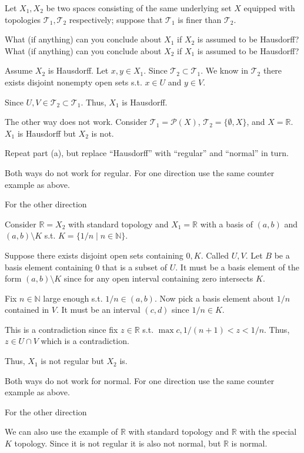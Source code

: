\documentclass[12pt, letterpaper]{article}
\newcommand{\R}{\mathbb{R}}
\newcommand{\N}{\mathbb{N}}
\newcommand{\T}{\mathcal{T}}
\begin{document}
\begin{problem}{}
    Let $X_1, X_2$ be two spaces consisting of the same underlying set
  $X$ equipped with topologies $\T_1, \T_2$ respectively;
  suppose that $\T_1$ is finer than $\T_2$.
\end{problem}

\begin{subproblem}{}
    What (if anything) can you conclude about $X_1$ if $X_2$ is
assumed to be Hausdorff? What (if anything) can you conclude
about $X_2$ if $X_1$ is assumed to be Hausdorff?
\end{subproblem}
\begin{problemproof}
    Assume $X_2$ is Hausdorff. Let $x,y \in X_1$. Since $\T_2 \subset \T_1$. We know in $\T_2$ there exists disjoint nonempty open sets s.t. $x \in U$ and $y \in V$.

    Since $U,V \in \T_2 \subset \T_1$. Thus, $X_1$ is Hausdorff.

    The other way does not work. Consider $\T_1=\mathcal{P}(X)$, $\T_2=\{\emptyset,X\}$, and $X=\R$. $X_1$ is Hausdorff but $X_2$ is not.
\end{problemproof}

\begin{subproblem}{}
    Repeat part (a), but replace ``Hausdorff'' with ``regular''
and ``normal'' in turn.
\end{subproblem}
\begin{problemproof}
    Both ways do not work for regular. For one direction use the same counter example as above.

    For the other direction 
    
    Consider $\R=X_2$ with standard topology and $X_1=\R$ with a basis of $(a,b)$ and $(a,b) \setminus K$ s.t. $K=\{1/n \mid n \in \N\}$.

    Suppose there exists disjoint open sets containing $0,K$. Called $U,V$. Let $B$ be a basis element containing $0$ that is a subset of $U$. It must be a basis element of the form $(a,b) \setminus K$ since for any open interval containing zero intersects $K$.

    Fix $n \in \N$ large enough s.t. $1/n \in (a,b)$. Now pick a basis element about $1/n$ contained in $V$. It must be an interval $(c,d)$ since $1/n \in K$.

    This is a contradiction since fix $z \in \R$ s.t. $\max{c,1/(n+1)} < z < 1/n$. Thus, $z \in U \cap V$ which is a contradiction.

    Thus, $X_1$ is not regular but $X_2$ is.

    Both ways do not work for normal. For one direction use the same counter example as above.

    For the other direction

    We can also use the example of $\R$ with standard topology and $\R$ with the special $K$ topology. Since it is not regular it is also not normal, but $\R$ is normal.
\end{problemproof}
\end{document}
